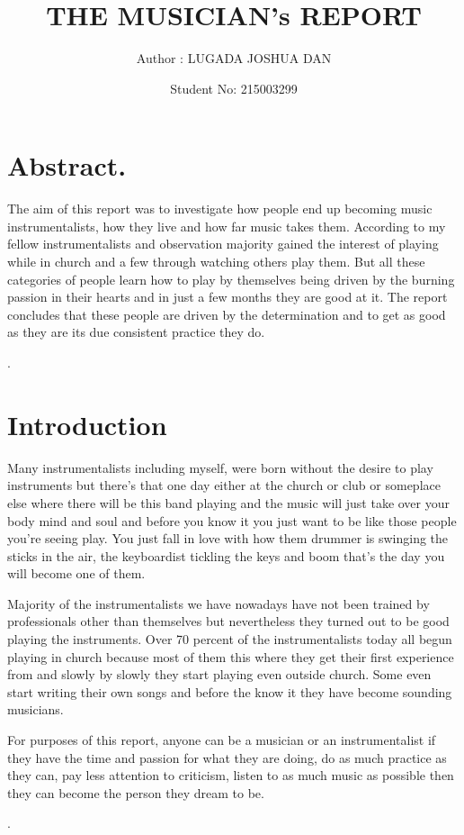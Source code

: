 \documentclass[14pt]{article}
\begin{document}
		\title{THE MUSICIAN's REPORT}
		\author{Author :  LUGADA JOSHUA DAN }
		\date{Student No: 215003299}
		\maketitle
	

	

	\section{Abstract.}
\begin{Large}

	The aim of this report was to investigate how people end up becoming music instrumentalists, how they live and how far music takes them. According to my fellow instrumentalists and observation majority gained the interest of playing while in church and a few through watching others play them. But all these categories of people learn how to play by themselves being driven by the burning passion in their hearts and in just a few months they are good at it. The report concludes that these people are driven by the determination and to get as good as they are its due consistent practice they do.  
 \end{Large}.

	\section{Introduction}
\begin{Large}

	Many instrumentalists including myself, were born without the desire to play instruments but there’s that one day either at the church or club or someplace else where there will be this band playing and the music will just take over your body mind and soul and before you know it you just want to be like those people you’re seeing play. You just fall in love with how them drummer is swinging the sticks in the air, the keyboardist tickling the keys and boom that’s the day you will become one of them.

	Majority of the instrumentalists we have nowadays have not been trained by professionals other than themselves but nevertheless they turned out to be good playing the instruments. Over 70 percent of the instrumentalists today all begun playing in church because most of them this where they get their first experience from and slowly by slowly they start playing even outside church. Some even start writing their own songs and before the know it they have become sounding musicians.

	For purposes of this report, anyone can be a musician or an instrumentalist if they have the time and passion for what they are doing, do as much practice as they can, pay less attention to criticism, listen to as much music as possible then they can become the person they dream to be.
 \end{Large}.
 
\end{document}
